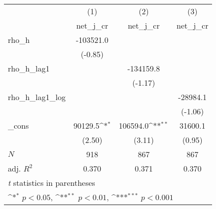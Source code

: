 {
\def\sym#1{\ifmmode^{#1}\else\(^{#1}\)\fi}
\begin{tabular}{l*{3}{c}}
\toprule
            &\multicolumn{1}{c}{(1)}&\multicolumn{1}{c}{(2)}&\multicolumn{1}{c}{(3)}\\
            &\multicolumn{1}{c}{net\_j\_cr}&\multicolumn{1}{c}{net\_j\_cr}&\multicolumn{1}{c}{net\_j\_cr}\\
\midrule
rho\_h       &   -103521.0         &                     &                     \\
            &     (-0.85)         &                     &                     \\
\addlinespace
rho\_h\_lag1  &                     &   -134159.8         &                     \\
            &                     &     (-1.17)         &                     \\
\addlinespace
rho\_h\_lag1\_log&                     &                     &    -28984.1         \\
            &                     &                     &     (-1.06)         \\
\addlinespace
\_cons      &     90129.5\sym{*}  &    106594.0\sym{**} &     31600.1         \\
            &      (2.50)         &      (3.11)         &      (0.95)         \\
\midrule
\(N\)       &         918         &         867         &         867         \\
adj. \(R^{2}\)&       0.370         &       0.371         &       0.370         \\
\bottomrule
\multicolumn{4}{l}{\footnotesize \textit{t} statistics in parentheses}\\
\multicolumn{4}{l}{\footnotesize \sym{*} \(p<0.05\), \sym{**} \(p<0.01\), \sym{***} \(p<0.001\)}\\
\end{tabular}
}
